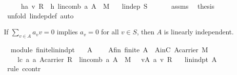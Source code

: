 \begin{isabellebody}
\ \ \ \ \ h{}{\isacharcolon}{\isachardoublequoteopen}a\ v{\isasymnoteq}\ {\isasymzero}\isactrlbsub R\isactrlesub {\isachardoublequoteclose}\ \ h{}{\isacharcolon}\ {\isachardoublequoteopen}{\isacharparenleft}lincomb\ a\ A\ {\isacharequal}\ {\isasymzero}\isactrlbsub M\isactrlesub {\isacharparenright}{\isachardoublequoteclose}\isanewline
\ \ \ {\isachardoublequoteopen}lin{\isacharunderscore}dep\ S{\isachardoublequoteclose}\isanewline
%
\isadelimproof
%
\endisadelimproof
%
\isatagproof
{}\isamarkupfalse%
\ {\isacharminus}\ \isanewline
\ \ \isamarkupfalse%
\ assms\ \isamarkupfalse%
\ {\isacharquery}thesis\isanewline
\ \ \ \ \isamarkupfalse%
\ {\isacharparenleft}unfold\ lin{\isacharunderscore}dep{\isacharunderscore}def{\isacharcomma}\ auto{\isacharparenright}\ \isanewline
{}\isamarkupfalse%
%
\endisatagproof
{\isafoldproof}%
%
\isadelimproof
%
\endisadelimproof
%
\begin{isamarkuptext}%
If $\sum_{v\in A} a_vv=0$ implies $a_v=0$ for all $v\in S$, then $A$ is linearly independent.%
\end{isamarkuptext}%
\isamarkuptrue%
\isamarkupfalse%
\ {\isacharparenleft}\ module{\isacharparenright}\ finite{\isacharunderscore}lin{\isacharunderscore}indpt{}{\isacharcolon}\isanewline
\ \ \ A\ \isanewline
\ \ \ A{\isacharunderscore}fin{\isacharcolon}\ {\isachardoublequoteopen}finite\ A{\isachardoublequoteclose}\ \ AinC{\isacharcolon}\ {\isachardoublequoteopen}A{\isasymsubseteq}carrier\ M{\isachardoublequoteclose}\ \isanewline
\ \ \ \ lc{}{\isacharcolon}\ {\isachardoublequoteopen}{\isasymAnd}a{\isachardot}\ a{\isasymin}\ {\isacharparenleft}A{\isasymrightarrow}carrier\ R{\isacharparenright}\ {\isasymLongrightarrow}\ {\isacharparenleft}lincomb\ a\ A\ {\isacharequal}\ {\isasymzero}\isactrlbsub M\isactrlesub {\isacharparenright}\ {\isasymLongrightarrow}\ {\isacharparenleft}{\isasymforall}\ v{\isasymin}A{\isachardot}\ a\ v{\isacharequal}\ {\isasymzero}\isactrlbsub R\isactrlesub {\isacharparenright}{\isachardoublequoteclose}\isanewline
\ \ \ {\isachardoublequoteopen}lin{\isacharunderscore}indpt\ A{\isachardoublequoteclose}\isanewline
%
\isadelimproof
%
\endisadelimproof
%
\isatagproof
{}\isamarkupfalse%
\ {\isacharparenleft}rule\ ccontr{\isacharparenright}\isanewline
\ \ \isamarkupfalse%

\end{isabellebody}
